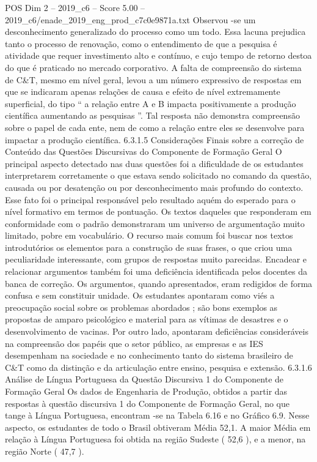 \begin{textsample}{POS Dim 2 – 2019\_c6 – Score 5.00 – 2019\_c6/enade\_2019\_eng\_prod\_c7c0e9871a.txt}
Observou -se um desconhecimento generalizado do processo como um todo.
Essa lacuna prejudica tanto o processo de renovação, como o entendimento de que a pesquisa é atividade que requer investimento alto e contínuo, e cujo tempo de retorno destoa do que é praticado no mercado corporativo.
A falta de compreensão do sistema de C\&T, mesmo em nível geral, levou a um número expressivo de respostas em que se indicaram apenas relações de causa e efeito de nível extremamente superficial, do tipo “ a relação entre A e B impacta positivamente a produção científica aumentando as pesquisas ”.
Tal resposta não demonstra compreensão sobre o papel de cada ente, nem de como a relação entre eles se desenvolve para impactar a produção científica. 6.3.1.5 Considerações Finais sobre a correção de Conteúdo das Questões Discursivas do Componente de Formação Geral O principal aspecto detectado nas duas questões foi a dificuldade de os estudantes interpretarem corretamente o que estava sendo solicitado no comando da questão, causada ou por desatenção ou por desconhecimento mais profundo do contexto.
Esse fato foi o principal responsável pelo resultado aquém do esperado para o nível formativo em termos de pontuação.
Os textos daqueles que responderam em conformidade com o padrão demonstraram um universo de argumentação muito limitado, pobre em vocabulário.
O recurso mais comum foi buscar nos textos introdutórios os elementos para a construção de suas frases, o que criou uma peculiaridade interessante, com grupos de respostas muito parecidas.
Encadear e relacionar argumentos também foi uma deficiência identificada pelos docentes da banca de correção.
Os argumentos, quando apresentados, eram redigidos de forma confusa e sem constituir unidade.
Os estudantes apontaram como viés a preocupação social sobre os problemas abordados ; são bons exemplos as propostas de amparo psicológico e material para as vítimas de desastres e o desenvolvimento de vacinas.
Por outro lado, apontaram deficiências consideráveis na compreensão dos papéis que o setor público, as empresas e as IES desempenham na sociedade e no conhecimento tanto do sistema brasileiro de C\&T como da distinção e da articulação entre ensino, pesquisa e extensão. 6.3.1.6 Análise de Língua Portuguesa da Questão Discursiva 1 do Componente de Formação Geral Os dados de Engenharia de Produção, obtidos a partir das respostas à questão discursiva 1 do Componente de Formação Geral, no que tange à Língua Portuguesa, encontram -se na Tabela 6.16 e no Gráfico 6.9.
Nesse aspecto, os estudantes de todo o Brasil obtiveram Média 52,1.
A maior Média em relação à Língua Portuguesa foi obtida na região Sudeste ( 52,6 ), e a menor, na região Norte ( 47,7 ).

\end{textsample}
